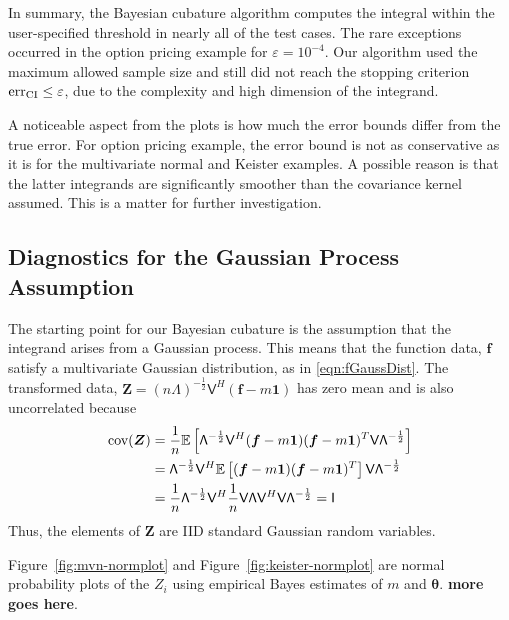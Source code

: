 \documentclass[twocolumn]{svjour3}          %
\newcommand{\bm}[1]{\boldsymbol{#1}}
\newcommand{\Ex}{\mathbb{E}}
\newcommand{\vtheta}{{\bm{\theta}}}
\newcommand{\vf}{\bm{f}}
\newcommand{\vZ}{\bm{Z}}
\newcommand{\vone}{\bm{1}}
\newcommand{\cov}{{\textup{cov}}}
\newcommand{\mLambda}{\mathsf{\Lambda}}
\newcommand{\mV}{\mathsf{V}}
\newcommand{\err}{\textup{err}}
\newcommand\figref{Figure~\ref}
\begin{document}
In summary, the Bayesian cubature algorithm computes the integral within the user-specified threshold in nearly all of the test cases.  The rare exceptions occurred in the option pricing example for $\varepsilon=10^{-4}$. Our algorithm used the maximum allowed sample size and still did not reach the stopping criterion $\err_{\textup{CI}} \leq \varepsilon$, due to the complexity and high dimension of the integrand. 

A noticeable aspect from the plots is how much the error bounds differ from the true error. For option pricing example, the error bound is not as conservative as it is for the multivariate normal and Keister examples. A possible reason is that the latter integrands are significantly smoother than the covariance kernel assumed.  This is a matter for further investigation.


\iffalse
\subsection{Diagnostics for the Gaussian Process Assumption}


The starting point for our Bayesian cubature is the assumption that the integrand arises from a Gaussian process. This means that the function data, $\vf$ satisfy a multivariate Gaussian distribution, as in \eqref{eqn:fGaussDist}.  The transformed data, $\vZ = ( n\mLambda)^{-\frac 12} \mV^H(\vf - m \vone)$ has zero mean and is also uncorrelated because
\begin{align*}
\cov (\vZ) 
&= \frac 1n \Ex\left[  
\mLambda^{-\frac 12} \mV^H (\vf - m \vone)
(\vf - m \vone)^T \mV \mLambda^{-\frac 12}
\right]
\\
&=
 \mLambda^{-\frac 12} \mV^H 
\Ex\left[ (\vf - m \vone)
(\vf - m \vone)^T \right] \mV \mLambda^{-\frac 12}
\\
&=
\frac{1}{n} \mLambda^{-\frac 12} \mV^H 
\frac 1n \mV \mLambda \mV^H \mV \mLambda^{-\frac 12}
 = \mathsf{I}
\end{align*}
Thus, the elements of $\vZ$ are IID standard Gaussian random variables.  

\figref{fig:mvn-normplot} and \figref{fig:keister-normplot} are normal probability plots of the $Z_i$ using empirical Bayes estimates of $m$ and $\vtheta$. \textbf{more goes here}.
\end{document}

